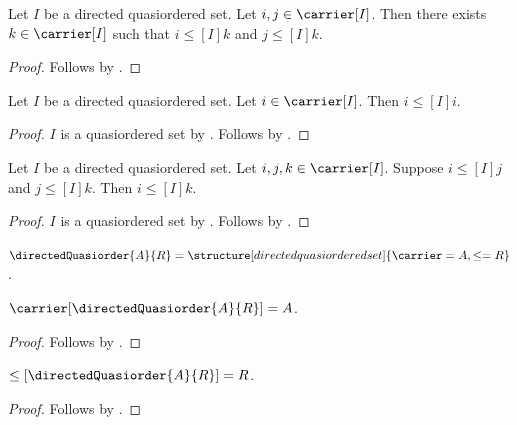 \begin{theorem}\label{directed_common_upper_bound}
    Let $I$ be a directed quasiordered set.
    Let $i,j\in\carrier[I]$.
    Then there exists $k\in\carrier[I]$ such that
        $i\mathrel{\leq[I]}k$ and $j\mathrel{\leq[I]}k$.
\end{theorem}
\begin{proof}
    Follows by .
\end{proof}

\begin{proposition}\label{directed_order_reflexive}
    Let $I$ be a directed quasiordered set.
    Let $i\in\carrier[I]$.
    Then $i\mathrel{\leq[I]}i$.
\end{proposition}
\begin{proof}
    $I$ is a quasiordered set by
        .
    Follows by .
\end{proof}

\begin{proposition}\label{directed_order_transitive}
    Let $I$ be a directed quasiordered set.
    Let $i,j,k\in\carrier[I]$.
    Suppose $i\mathrel{\leq[I]}j$ and $j\mathrel{\leq[I]}k$.
    Then $i\mathrel{\leq[I]}k$.
\end{proposition}
\begin{proof}
    $I$ is a quasiordered set by
        .
    Follows by .
\end{proof}

\begin{definition}\label{directed_quasiorder}
    $\directedQuasiorder{A}{R}=
        \structure[directed quasiordered set]{
            \carrier=A,
            \leq=R
        }$.
\end{definition}

\begin{proposition}\label{directed_quasiorder_carrier}
    $\carrier[\directedQuasiorder{A}{R}]=A$.
\end{proposition}
\begin{proof}
    Follows by
        .
\end{proof}

\begin{proposition}\label{directed_quasiorder_relation}
    $\leq[\directedQuasiorder{A}{R}]=R$.
\end{proposition}
\begin{proof}
    Follows by
        .
\end{proof}

